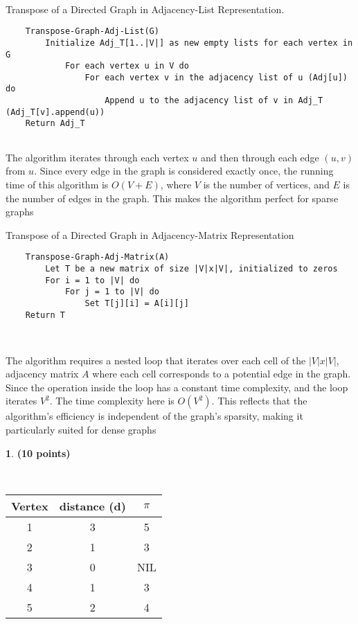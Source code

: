 \documentclass[11pt]{article}
\theoremstyle{definition}
\newtheorem{prob}{}
\newcommand{\solution}{\medskip\noindent{\color{DarkBlue}\textbf{Solution:}}}
\begin{document}
\solution \\

Transpose of a Directed Graph in Adjacency-List Representation. \\

\begin{verbatim}
    Transpose-Graph-Adj-List(G)
        Initialize Adj_T[1..|V|] as new empty lists for each vertex in G
            For each vertex u in V do
                For each vertex v in the adjacency list of u (Adj[u]) do
                    Append u to the adjacency list of v in Adj_T (Adj_T[v].append(u))
    Return Adj_T
    
\end{verbatim}

The algorithm iterates through each vertex $u$ and then through each edge $(u,v)$ from $u$.
Since every edge in the graph is considered exactly once, the running time of this algorithm is $O(V+E)$,
where $V$ is the number of vertices, and $E$ is the number of edges in the graph. This makes the algorithm perfect
for sparse graphs

Transpose of a Directed Graph in Adjacency-Matrix Representation \\

\begin{verbatim}
    Transpose-Graph-Adj-Matrix(A)
        Let T be a new matrix of size |V|x|V|, initialized to zeros
        For i = 1 to |V| do
            For j = 1 to |V| do
                Set T[j][i] = A[i][j]
    Return T

    
\end{verbatim}

The algorithm requires a nested loop that iterates over each cell of the $|V| x |V|$, adjacency matrix $A$
where each cell corresponds to a potential edge in the graph. Since the operation inside the loop has a constant time complexity,
and the loop iterates $V^2$. The time complexity here is $O(V^2)$. This reflects that the algorithm's efficiency is independent of the graph's sparsity, making it particularly suited for dense graphs

\begin{prob} \textbf{(10 points)}
\end{prob}

\solution \\

\begin{tabular}{|c|c|c|}
    \hline
    Vertex & distance (d) & $\pi$ \\
    \hline
    1 & 3 & 5 \\
    2 & 1 & 3 \\
    3 & 0 & NIL \\
    4 & 1 & 3 \\
    5 & 2 & 4 \\
    
    \hline
\end{tabular}
\\
\end{document}
